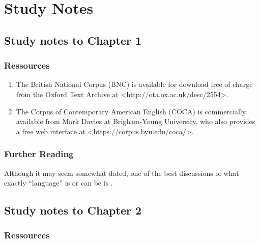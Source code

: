 \chapter{Study Notes}
\label{ch:studynotes}

\section{Study notes to Chapter 1}
\label{sec:studynotes01}

\subsection{Ressources}
\label{sec:ressources01}

\begin{enumerate}
  \item The British National Corpus (BNC) is available for download free of charge from the Oxford Text Archive at <http://ota.ox.ac.uk/desc/2554>.
  \item The Corpus of Contemporary American English (COCA) is commercially available from Mark Davies at Brigham-Young University, who also provides a free web interface at <https://corpus.byu.edu/coca/>.
\end{enumerate}

\subsection{Further Reading}
\label{sec:furtherreading01}

Although it may seem somewhat dated, one of the best discussions of what exactly ``language'' is or can be is \citet{lyons_language_1981}.

\section{Study notes to Chapter 2}
\label{sec:studynotes02}

\subsection{Ressources}
\label{sec:ressources02}

